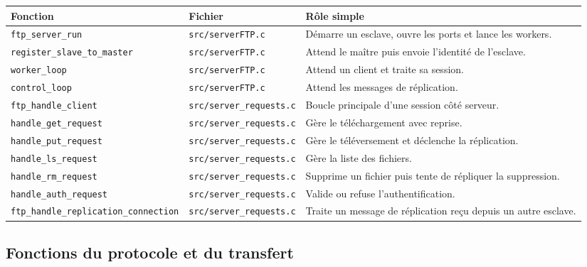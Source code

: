 \documentclass[a4paper,11pt]{article}
\newcommand{\codecell}[1]{{\footnotesize\nolinkurl{#1}}}
\begin{document}
\begin{center}
\small
\begin{tabularx}{\textwidth}{@{}L{0.28\textwidth}L{0.22\textwidth}L{0.42\textwidth}@{}}
\toprule
\textbf{Fonction} & \textbf{Fichier} & \textbf{Rôle simple} \\
\midrule
\codecell{ftp_server_run} & \codecell{src/serverFTP.c} & Démarre un esclave, ouvre les ports et lance les workers. \\
\codecell{register_slave_to_master} & \codecell{src/serverFTP.c} & Attend le maître puis envoie l'identité de l'esclave. \\
\codecell{worker_loop} & \codecell{src/serverFTP.c} & Attend un client et traite sa session. \\
\codecell{control_loop} & \codecell{src/serverFTP.c} & Attend les messages de réplication. \\
\codecell{ftp_handle_client} & \codecell{src/server_requests.c} & Boucle principale d'une session côté serveur. \\
\codecell{handle_get_request} & \codecell{src/server_requests.c} & Gère le téléchargement avec reprise. \\
\codecell{handle_put_request} & \codecell{src/server_requests.c} & Gère le téléversement et déclenche la réplication. \\
\codecell{handle_ls_request} & \codecell{src/server_requests.c} & Gère la liste des fichiers. \\
\codecell{handle_rm_request} & \codecell{src/server_requests.c} & Supprime un fichier puis tente de répliquer la suppression. \\
\codecell{handle_auth_request} & \codecell{src/server_requests.c} & Valide ou refuse l'authentification. \\
\codecell{ftp_handle_replication_connection} & \codecell{src/server_requests.c} & Traite un message de réplication reçu depuis un autre esclave. \\
\bottomrule
\end{tabularx}
\end{center}

\subsection{Fonctions du protocole et du transfert}
\end{document}
